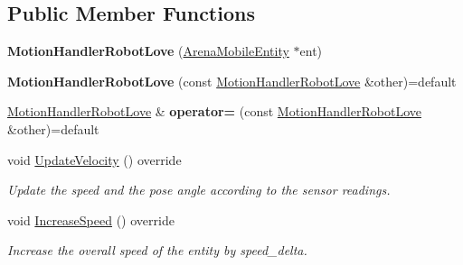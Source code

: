 \subsection*{Public Member Functions}
\begin{DoxyCompactItemize}
\item 
\mbox{\label{class_motion_handler_robot_love_aa2e0d7f03281a230f095d825ab2b35c6}} 
{\bfseries Motion\+Handler\+Robot\+Love} (\mbox{\hyperlink{class_arena_mobile_entity}{Arena\+Mobile\+Entity}} $\ast$ent)
\item 
\mbox{\label{class_motion_handler_robot_love_a547d8a567954d2b82ef8e5f30f1c9515}} 
{\bfseries Motion\+Handler\+Robot\+Love} (const \mbox{\hyperlink{class_motion_handler_robot_love}{Motion\+Handler\+Robot\+Love}} \&other)=default
\item 
\mbox{\label{class_motion_handler_robot_love_a5a281795ebc5df70d5529fc012bc4aa5}} 
\mbox{\hyperlink{class_motion_handler_robot_love}{Motion\+Handler\+Robot\+Love}} \& {\bfseries operator=} (const \mbox{\hyperlink{class_motion_handler_robot_love}{Motion\+Handler\+Robot\+Love}} \&other)=default
\item 
\mbox{\label{class_motion_handler_robot_love_a3d4030e29ee33bbd4cddfc9850543615}} 
void \mbox{\hyperlink{class_motion_handler_robot_love_a3d4030e29ee33bbd4cddfc9850543615}{Update\+Velocity}} () override
\begin{DoxyCompactList}\small\item\em Update the speed and the pose angle according to the sensor readings. \end{DoxyCompactList}\item 
\mbox{\label{class_motion_handler_robot_love_ac4b0287075f1ec75e9b1bb776eb428f6}} 
void \mbox{\hyperlink{class_motion_handler_robot_love_ac4b0287075f1ec75e9b1bb776eb428f6}{Increase\+Speed}} () override
\begin{DoxyCompactList}\small\item\em Increase the overall speed of the entity by speed\+\_\+delta. \end{DoxyCompactList}\item 
\mbox{\label{class_motion_handler_robot_love_af64d850f198beaccdc9dad1a519c387c}} 

\end{DoxyCompactItemize}
